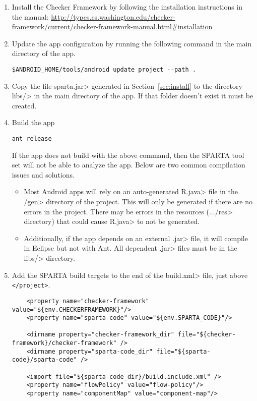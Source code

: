 \begin{enumerate}

\item Install the Checker Framework by following the installation instructions in the manual:
\url{http://types.cs.washington.edu/checker-framework/current/checker-framework-manual.html#installation}

\item
Update the app configuration by running the following command in the main directory of the
app.
\begin{Verbatim}
$ANDROID_HOME/tools/android update project --path .
\end{Verbatim}

\item
Copy the file \<sparta.jar> generated in Section~\ref{sec:install} to the
directory \<libs/> in the main directory of the app. If that folder doesn't
exist it must be created.

\item Build the app

\begin{Verbatim}
ant release
\end{Verbatim}
If the app does not build with the above command, then the SPARTA tool set will
not be able to analyze the app.  Below are two common compilation issues and
solutions.
\begin{itemize}
\item
Most Android apps will rely on an auto-generated \<R.java> file
in the \</gen> directory of the project. This will only be generated
if there are no errors in the project. There may be errors in the
resources (\<.../res> directory) that could cause \<R.java> to not be
generated.

\item
Additionally, if the app depends on an external \<.jar> file, it will compile
in Eclipse but not with Ant. All dependent \<.jar> files must be in the
\<libs/> directory.
\end{itemize}

\item
Add the SPARTA build targets to the end of the \<build.xml>
 file, just above \verb|</project>|.


\begin{Verbatim}
    <property name="checker-framework" value="${env.CHECKERFRAMEWORK}"/>
    <property name="sparta-code" value="${env.SPARTA_CODE}"/>

    <dirname property="checker-framework_dir" file="${checker-framework}/checker-framework" />
    <dirname property="sparta-code_dir" file="${sparta-code}/sparta-code" />

    <import file="${sparta-code_dir}/build.include.xml" />
    <property name="flowPolicy" value="flow-policy"/>
    <property name="componentMap" value="component-map"/>
\end{Verbatim}

\end{enumerate}

